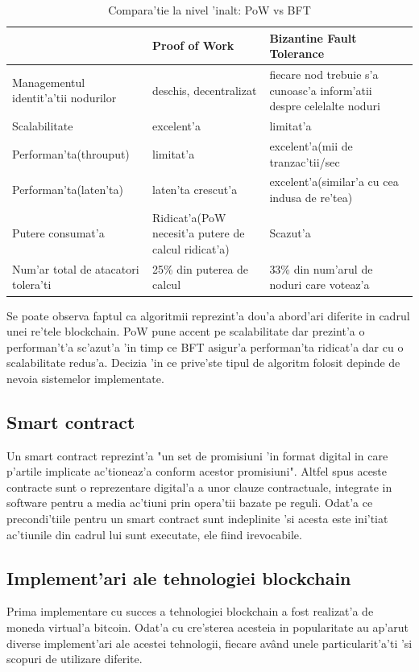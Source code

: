 \documentclass[12pt,a4paper,twoside]{report}
\begin{document}
	

\begin{table}[H]
\caption{Compara'tie la nivel 'inalt: PoW vs BFT}
\centering
\begin{tabular}{|p{5cm}|p{5cm}|p{5cm}|}      
\hline\hline                        
 & Proof of Work & Bizantine Fault Tolerance \\ [0.5ex]  
\hline                             
Managementul identit'a'tii nodurilor & deschis, decentralizat & fiecare nod trebuie s'a cunoasc'a inform'atii despre celelalte noduri\\ 
\hline  
Scalabilitate & excelent'a & limitat'a \\              
\hline 
Performan'ta(throuput) & limitat'a & excelent'a(mii de tranzac'tii/sec	\\
\hline 
Performan'ta(laten'ta) & laten'ta crescut'a & excelent'a(similar'a cu cea indusa de re'tea) \\
\hline 
Putere consumat'a & Ridicat'a(PoW necesit'a putere de calcul ridicat'a) & Scazut'a \\
\hline 
Num'ar total de atacatori tolera'ti & 25\% din puterea de calcul  & 33\% din num'arul de noduri care voteaz'a\\[1ex]
           
\hline                              
\end{tabular}
\label{table1} 
\end{table}

Se poate observa faptul ca algoritmii reprezint'a dou'a abord'ari diferite in cadrul unei re'tele blockchain. PoW pune accent pe scalabilitate dar prezint'a o performan't'a sc'azut'a 'in timp ce BFT asigur'a performan'ta ridicat'a dar cu o scalabilitate redus'a. Decizia 'in ce prive'ste tipul de algoritm folosit depinde de nevoia sistemelor implementate.
	\subsection{Smart contract}
	Un smart contract reprezint'a "un set de promisiuni 'in format digital in care p'artile implicate ac'tioneaz'a conform acestor promisiuni"\cite{sc}. Altfel spus aceste contracte sunt o reprezentare digital'a a unor clauze contractuale, integrate in software pentru a media ac'tiuni prin opera'tii bazate pe reguli. Odat'a ce precondi'tiile pentru un smart contract sunt indeplinite 'si acesta este ini'tiat ac'tiunile din cadrul lui sunt executate, ele fiind irevocabile.
	\subsection{Implement'ari ale tehnologiei blockchain}
	Prima implementare cu succes a tehnologiei blockchain a fost realizat'a de moneda virtual'a bitcoin. Odat'a cu cre'sterea acesteia in popularitate au ap'arut diverse implement'ari ale acestei tehnologii, fiecare av\^and unele particularit'a'ti 'si scopuri de utilizare diferite.
	
\end{document}
